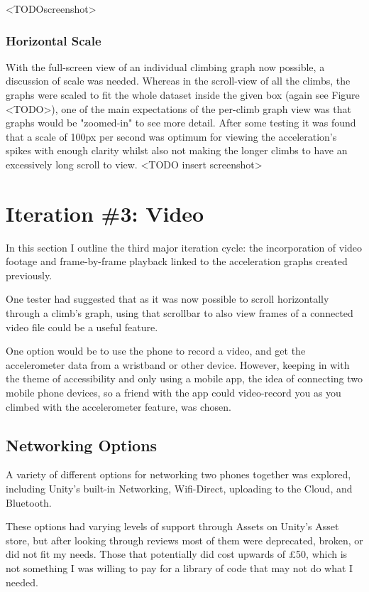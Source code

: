 <TODOscreenshot>



\subsubsection{Horizontal Scale}
With the full-screen view of an individual climbing graph now possible, a discussion of scale was needed. 
Whereas in the scroll-view of all the climbs, the graphs were scaled to fit the whole dataset inside the given box (again see Figure <TODO>), one of the main expectations of the per-climb graph view was that graphs would be "zoomed-in" to see more detail.
After some testing it was found that a scale of 100px per second was optimum for viewing the acceleration's spikes with enough clarity whilst also not making the longer climbs to have an excessively long scroll to view. 
<TODO insert screenshot>





\section{Iteration \#3: Video}
In this section I outline the third major iteration cycle: the incorporation of video footage and frame-by-frame playback linked to the acceleration graphs created previously.


One tester had suggested that as it was now possible to scroll horizontally through a climb's graph, using that scrollbar to also view frames of a connected video file could be a useful feature.

One option would be to use the phone to record a video, and get the accelerometer data from a wristband or other device.
However, keeping in with the theme of accessibility and only using a mobile app, the idea of connecting two mobile phone devices, so a friend with the app could video-record you as you climbed with the accelerometer feature, was chosen.


\subsection{Networking Options}
A variety of different options for networking two phones together was explored, including Unity's built-in Networking, Wifi-Direct, uploading to the Cloud, and Bluetooth.


These options had varying levels of support through Assets on Unity's Asset store, but after looking through reviews most of them were deprecated, broken, or did not fit my needs.
Those that potentially did cost upwards of \pounds50, which is not something I was willing to pay for a library of code that may not do what I needed.

